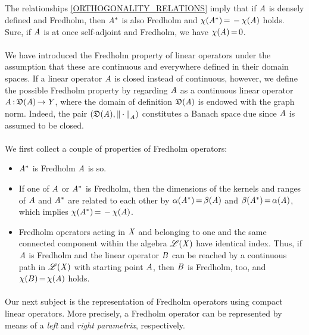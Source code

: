 \documentclass[11pt,twoside]{article}
\begin{document}
\subparagraph{} %
The relationships \eqref{ORTHOGONALITY_RELATIONS} imply
that if $\mathit{A}$ is densely defined and Fredholm,
then $\mathit{A}^*$ is also Fredholm and $\chi(\mathit{A}^*) {\,=\,} -\chi(\mathit{A})$ holds.
Sure,
if $\mathit{A}$ is at once self-adjoint and Fredholm,
we have $\chi(\mathit{A}) {\,=\,} 0$.

\paragraph{} %
We have introduced the Fredholm property of linear operators
under the assumption that
these are continuous and everywhere defined in their domain spaces.
If a linear operator $\mathit{A}$ is closed instead of continuous,
however,
we define the possible Fredholm property by regarding
$\mathit{A}$ as a continuous linear operator $\mathit{A} {\,:\,} \mathfrak{D}(\mathit{A}) {\,\to\,} \mathit{Y}$,
where the domain of definition $\mathfrak{D}(\mathit{A})$ is endowed
with the graph norm.
Indeed,
the pair $(\mathfrak{D}(\mathit{A}),\left\lVert \,\cdot\, \right\rVert_{\mathit{A}})$
constitutes a Banach space due since $\mathit{A}$ is assumed to be closed.

\paragraph{} %
We first collect a couple of properties of Fredholm operators:

\begin{itemize}[leftmargin=4mm]
\item[1.]
$\mathit{A}^*$ is Fredholm \iff $\mathit{A}$ is so.

\item[2.]
If one of $\mathit{A}$ or $\mathit{A}^*$ is Fredholm,
then the dimensions of the kernels and ranges of $\mathit{A}$ and $\mathit{A}^*$
are related to each other by
$\alpha(\mathit{A}^*) {\,=\,} \beta(\mathit{A})$ and
$\beta(\mathit{A}^*)  {\,=\,} \alpha(\mathit{A})$,
which implies $\chi(\mathit{A}^*) {\,=\,} - \chi(\mathit{A})$.

\item[3.]
Fredholm operators acting in $\mathit{X}$ and
belonging to one and the same connected component
within the algebra $\mathscr{L}(\mathit{X})$ have identical index.
Thus,
if $\mathit{A}$ is Fredholm and the linear operator ${B}$ can be reached
by a continuous path in $\mathscr{L}(\mathit{X})$ with starting point $\mathit{A}$,
then ${B}$ is Fredholm,
too,
and $\chi({B}) {\,=\,} \chi(\mathit{A})$ holds.
\end{itemize}

\paragraph{} %
Our next subject is the representation of Fredholm operators
using compact linear operators.
More precisely,
a Fredholm operator can be represented by means of
a \textit{left} and \textit{right parametrix},
respectively.
\end{document}
